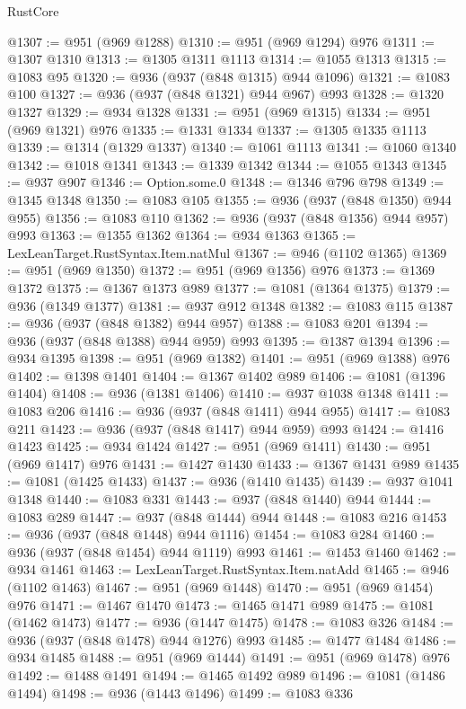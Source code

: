 \begin{lexlean}{RustCore}
\begin{coremodule}
@1307 := @951 (@969 @1288)
@1310 := @951 (@969 @1294) @976
@1311 := @1307 @1310
@1313 := @1305 @1311 @1113
@1314 := @1055 @1313
@1315 := @1083 @95
@1320 := @936 (@937 (@848 @1315) @944 @1096)
@1321 := @1083 @100
@1327 := @936 (@937 (@848 @1321) @944 @967) @993
@1328 := @1320 @1327
@1329 := @934 @1328
@1331 := @951 (@969 @1315)
@1334 := @951 (@969 @1321) @976
@1335 := @1331 @1334
@1337 := @1305 @1335 @1113
@1339 := @1314 (@1329 @1337)
@1340 := @1061 @1113
@1341 := @1060 @1340
@1342 := @1018 @1341
@1343 := @1339 @1342
@1344 := @1055 @1343
@1345 := @937 @907
@1346 := Option.some.{0}
@1348 := @1346 @796 @798
@1349 := @1345 @1348
@1350 := @1083 @105
@1355 := @936 (@937 (@848 @1350) @944 @955)
@1356 := @1083 @110
@1362 := @936 (@937 (@848 @1356) @944 @957) @993
@1363 := @1355 @1362
@1364 := @934 @1363
@1365 := LexLeanTarget.RustSyntax.Item.natMul
@1367 := @946 (@1102 @1365)
@1369 := @951 (@969 @1350)
@1372 := @951 (@969 @1356) @976
@1373 := @1369 @1372
@1375 := @1367 @1373 @989
@1377 := @1081 (@1364 @1375)
@1379 := @936 (@1349 @1377)
@1381 := @937 @912 @1348
@1382 := @1083 @115
@1387 := @936 (@937 (@848 @1382) @944 @957)
@1388 := @1083 @201
@1394 := @936 (@937 (@848 @1388) @944 @959) @993
@1395 := @1387 @1394
@1396 := @934 @1395
@1398 := @951 (@969 @1382)
@1401 := @951 (@969 @1388) @976
@1402 := @1398 @1401
@1404 := @1367 @1402 @989
@1406 := @1081 (@1396 @1404)
@1408 := @936 (@1381 @1406)
@1410 := @937 @1038 @1348
@1411 := @1083 @206
@1416 := @936 (@937 (@848 @1411) @944 @955)
@1417 := @1083 @211
@1423 := @936 (@937 (@848 @1417) @944 @959) @993
@1424 := @1416 @1423
@1425 := @934 @1424
@1427 := @951 (@969 @1411)
@1430 := @951 (@969 @1417) @976
@1431 := @1427 @1430
@1433 := @1367 @1431 @989
@1435 := @1081 (@1425 @1433)
@1437 := @936 (@1410 @1435)
@1439 := @937 @1041 @1348
@1440 := @1083 @331
@1443 := @937 (@848 @1440) @944
@1444 := @1083 @289
@1447 := @937 (@848 @1444) @944
@1448 := @1083 @216
@1453 := @936 (@937 (@848 @1448) @944 @1116)
@1454 := @1083 @284
@1460 := @936 (@937 (@848 @1454) @944 @1119) @993
@1461 := @1453 @1460
@1462 := @934 @1461
@1463 := LexLeanTarget.RustSyntax.Item.natAdd
@1465 := @946 (@1102 @1463)
@1467 := @951 (@969 @1448)
@1470 := @951 (@969 @1454) @976
@1471 := @1467 @1470
@1473 := @1465 @1471 @989
@1475 := @1081 (@1462 @1473)
@1477 := @936 (@1447 @1475)
@1478 := @1083 @326
@1484 := @936 (@937 (@848 @1478) @944 @1276) @993
@1485 := @1477 @1484
@1486 := @934 @1485
@1488 := @951 (@969 @1444)
@1491 := @951 (@969 @1478) @976
@1492 := @1488 @1491
@1494 := @1465 @1492 @989
@1496 := @1081 (@1486 @1494)
@1498 := @936 (@1443 @1496)
@1499 := @1083 @336

\end{coremodule}
\end{lexlean}
